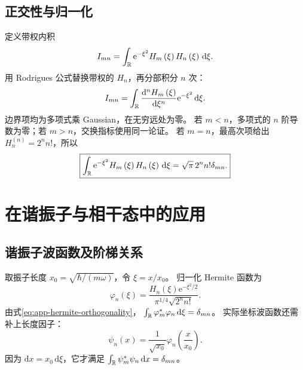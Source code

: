 \subsection{正交性与归一化}
定义带权内积
\begin{equation}
I_{mn}=\int_{\mathbb{R}}\mathrm{e}^{-\xi^2}H_m\left(\xi\right)H_n\left(\xi\right)\,\mathrm{d}\xi.
\end{equation}
用 Rodrigues 公式替换带权的 $H_n$，再分部积分 $n$ 次：
\begin{equation}
I_{mn}
=\int_{\mathbb{R}}\frac{\mathrm{d}^nH_m\left(\xi\right)}{\mathrm{d}\xi^n}
\mathrm{e}^{-\xi^2}\,\mathrm{d}\xi.
\end{equation}
边界项均为多项式乘 Gaussian，在无穷远处为零。
若 $m<n$，多项式的 $n$ 阶导数为零；若 $m>n$，交换指标使用同一论证。
若 $m=n$，最高次项给出 $H_n^{\left(n\right)}=2^n n!$，所以
\begin{equation}
\boxed{\int_{\mathbb{R}}\mathrm{e}^{-\xi^2}H_m\left(\xi\right)H_n\left(\xi\right)\,\mathrm{d}\xi
=\sqrt\pi\,2^n n!\delta_{mn}.}
\label{eq:app-hermite-orthogonality}
\end{equation}

\section{在谐振子与相干态中的应用}
\subsection{谐振子波函数及阶梯关系}
取振子长度 $x_0=\sqrt{\hbar/\left(m\omega\right)}$，令 $\xi=x/x_0$。
归一化 Hermite 函数为
\begin{equation}
\varphi_n\left(\xi\right)=
\frac{H_n\left(\xi\right)\mathrm{e}^{-\xi^2/2}}{\pi^{1/4}\sqrt{2^n n!}}.
\end{equation}
由式\eqref{eq:app-hermite-orthogonality}，
$\int_{\mathbb{R}}\varphi_m^*\varphi_n\,\mathrm{d}\xi=\delta_{mn}$。
实际坐标波函数还需补上长度因子：
\begin{equation}
\psi_n\left(x\right)=\frac{1}{\sqrt{x_0}}\varphi_n\left(\frac{x}{x_0}\right).
\end{equation}
因为 $\mathrm{d}x=x_0\,\mathrm{d}\xi$，它才满足
$\int_{\mathbb{R}}\psi_m^*\psi_n\,\mathrm{d}x=\delta_{mn}$。

